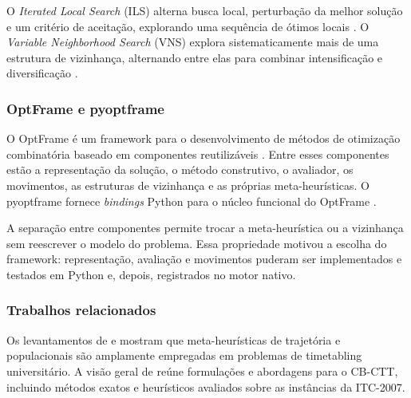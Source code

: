 O \textit{Iterated Local Search} (ILS) alterna busca local, perturbação da melhor solução e um critério de aceitação, explorando uma sequência de ótimos locais \cite{lourenco2003iterated}. O \textit{Variable Neighborhood Search} (VNS) explora sistematicamente mais de uma estrutura de vizinhança, alternando entre elas para combinar intensificação e diversificação \cite{hansen2001variable}.

\subsubsection{OptFrame e pyoptframe}

O OptFrame é um framework para o desenvolvimento de métodos de otimização combinatória baseado em componentes reutilizáveis \cite{coelho2010optframe,coelho2020microbenchmark}. Entre esses componentes estão a representação da solução, o método construtivo, o avaliador, os movimentos, as estruturas de vizinhança e as próprias meta-heurísticas. O pyoptframe fornece \textit{bindings} Python para o núcleo funcional do OptFrame \cite{pyoptframe2026}.

A separação entre componentes permite trocar a meta-heurística ou a vizinhança sem reescrever o modelo do problema. Essa propriedade motivou a escolha do framework: representação, avaliação e movimentos puderam ser implementados e testados em Python e, depois, registrados no motor nativo.

\subsubsection{Trabalhos relacionados}
\label{subsubsec:relacionados}

Os levantamentos de  e  mostram que meta-heurísticas de trajetória e populacionais são amplamente empregadas em problemas de timetabling universitário. A visão geral de  reúne formulações e abordagens para o CB-CTT, incluindo métodos exatos e heurísticos avaliados sobre as instâncias da ITC-2007.

